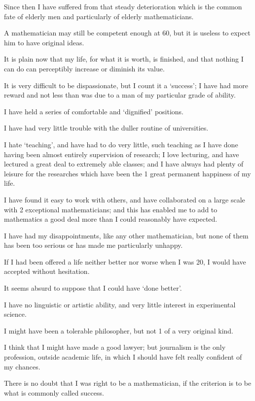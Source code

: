 \documentclass{article}
\numberwithin{equation}{section}
\begin{document}
Since then I have suffered from that steady deterioration which is the common fate of elderly men and particularly of elderly mathematicians.

A mathematician may still be competent enough at 60, but it is useless to expect him to have original ideas.

%
It is plain now that my life, for what it is worth, is finished, and that nothing I can do can perceptibly increase or diminish its value.

It is very difficult to be dispassionate, but I count it a `success'; I have had more reward and not less than was due to a man of my particular grade of ability.

I have held a series of comfortable and `dignified' positions.

I have had very little trouble with the duller routine of universities.

I hate `teaching', and have had to do very little, such teaching as I have done having been almost entirely supervision of research; I love lecturing, and have lectured a great deal to extremely able classes; and I have always had plenty of leisure for the researches which have been the 1 great permanent happiness of my life.

I have found it easy to work with others, and have collaborated on a large scale with 2 exceptional mathematicians; and this has enabled me to add to mathematics a good deal more than I could reasonably have expected.

I have had my disappointments, like any other mathematician, but none of them has been too serious or has made me particularly unhappy.

If I had been offered a life neither better nor worse when I was 20, I would have accepted without hesitation.

%
It seems absurd to suppose that I could have `done better'.

I have no linguistic or artistic ability, and very little interest in experimental science.

I might have been a tolerable philosopher, but not 1 of a very original kind.

I think that I might have made a good lawyer; but journalism is the only profession, outside academic life, in which I should have felt really confident of my chances.

There is no doubt that I was right to be a mathematician, if the criterion is to be what is commonly called success.
\end{document}
